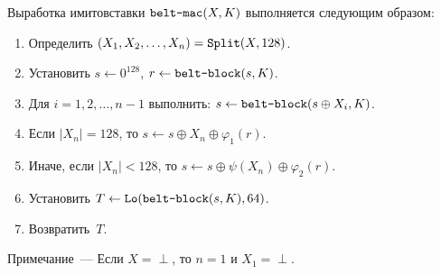 Выработка имитовставки $\texttt{belt-mac}(X,K)$ выполняется следующим образом:
\begin{enumerate}
\item
Определить $(X_1,X_2,\ldots,X_n)=\mathop{\texttt{Split}}\nolimits(X,128)$.
\item
Установить
$s\leftarrow 0^{128}$, $r\leftarrow \texttt{belt-block}(s,K)$.
\item
Для $i=1,2,\ldots,n-1$ выполнить:
$s\leftarrow \texttt{belt-block}(s\oplus X_i,K)$.
\item
Если $|X_n|=128$, то 
$s\leftarrow s\oplus X_n\oplus \varphi_1(r)$.
\item
Иначе, если $|X_n|<128$, то
$s\leftarrow s\oplus\psi(X_n)\oplus\varphi_2(r)$.
\item
Установить
$T\leftarrow\mathop{\texttt{Lo}}\nolimits(\texttt{belt-block}(s,K), 64)$.
\item
Возвратить~$T$.
\end{enumerate}

\vskip9pt
\begin{note}
Примечание~--- Если $X=\perp$, то $n=1$ и $X_1=\perp$.
\end{note}
